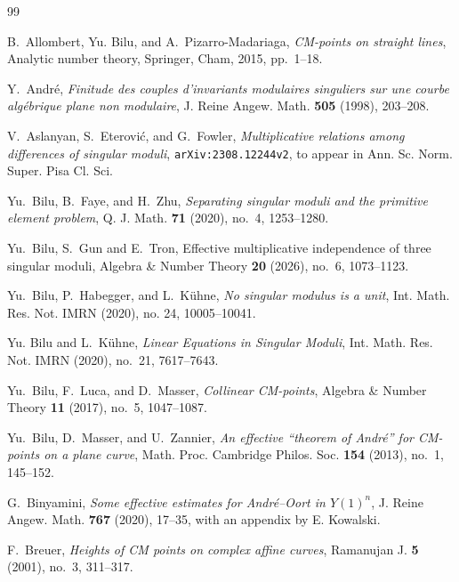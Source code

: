 \documentclass[12pt,a4paper,oneside]{amsart}
\begin{document}
	
	
\begin{thebibliography}{99}
	
	B.~Allombert, Yu. Bilu, and A.~Pizarro-Madariaga, \emph{C{M}-points on straight
		lines}, Analytic number theory, Springer, Cham, 2015, pp.~1--18.
		
Y.~Andr\'{e}, \emph{Finitude des couples d'invariants modulaires singuliers sur
  une courbe alg\'{e}brique plane non modulaire}, J. Reine Angew. Math.
  \textbf{505} (1998), 203--208.
  
V.~Aslanyan, S.~Eterović, and G.~Fowler, \emph{Multiplicative relations among
  differences of singular moduli},  \texttt{ar{X}iv:2308.12244v2}, to appear in Ann. Sc. Norm. Super. Pisa Cl. Sci.
	
	Yu.~Bilu, B.~Faye, and H.~Zhu, \emph{Separating singular moduli and the
		primitive element problem}, Q. J. Math. \textbf{71} (2020), no.~4,
	1253--1280.
	
  Yu.~Bilu, S.~Gun and E.~Tron, Effective multiplicative independence of three singular moduli, Algebra \& Number Theory {\bf 20} (2026), no.~6, 1073--1123.
  
   Yu.~Bilu, P.~Habegger, and L.~Kühne, \emph{No singular modulus is a unit}, Int. Math. Res. Not. IMRN (2020), no. 24, 10005--10041.
  
Yu. Bilu and L.~K\"{u}hne, \emph{Linear {E}quations in {S}ingular {M}oduli},
  Int. Math. Res. Not. IMRN (2020), no.~21, 7617--7643.
  
Yu.~Bilu, F.~Luca, and D.~Masser, \emph{Collinear {CM}-points}, Algebra \&
  Number Theory \textbf{11} (2017), no.~5, 1047--1087.
	
	Yu.~Bilu, D.~Masser, and U.~Zannier, \emph{An effective ``theorem of
		{A}ndr\'{e}'' for {CM}-points on a plane curve}, Math. Proc. Cambridge
	Philos. Soc. \textbf{154} (2013), no.~1, 145--152.
	
G.~Binyamini, \emph{Some effective estimates for {A}ndr\'{e}--{O}ort in
  {$Y(1)^n$}}, J. Reine Angew. Math. \textbf{767} (2020), 17--35, with an
  appendix by E. Kowalski.
  
F.~Breuer, \emph{Heights of {CM} points on complex affine curves}, Ramanujan J.
  \textbf{5} (2001), no.~3, 311--317.
	

\end{thebibliography}
\end{document}

